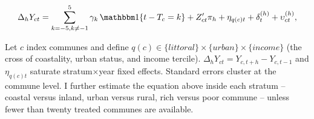 
\begin{align*}
\Delta_h Y_{ct}
=\sum_{k=-5,k\neq-1}^{5}\gamma_k\,
   \mathbbm 1\{t-T_c=k\}
  +Z_{ct}'\pi_h
  +\eta_{q(c)t}
  +\delta_t^{(h)}
  +\upsilon_{ct}^{(h)},                                   \label{eq:commune}
\end{align*}


Let $c$ index communes and define
$q(c)\in\{\textit{littoral}\}\times\{\textit{urban}\}\times\{\textit{income}\}$
(the cross of coastality, urban status, and income tercile). $\Delta_h Y_{ct}=Y_{c,t+h}-Y_{c,t-1}$ and
$\eta_{q(c)t}$ saturate stratum$\times$year fixed effects.
Standard errors cluster at the commune level. I further estimate the equation above inside each stratum -- coastal versus inland, urban versus rural, rich versus poor commune -- unless fewer than twenty treated communes are available.

